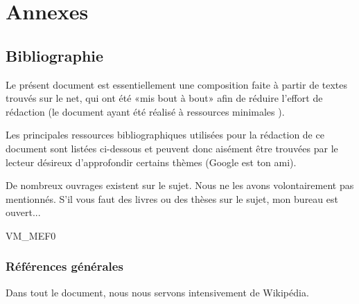 \documentclass[11pt,pdflatex]{book}
\begin{document}
 \appendix
 \part{Annexes}
 
 
 
 



 \ifVersionDuDocEstVincent
    \chapter*{Bibliographie}

Le présent document est essentiellement une composition faite à partir de textes  trouvés sur le net, qui ont été «mis bout à bout» afin de réduire l'effort  de rédaction (le document ayant été réalisé à ressources minimales ).


 Les principales  ressources bibliographiques utilisées pour la rédaction de ce document  sont listées ci-dessous et peuvent donc aisément être trouvées par le lecteur  désireux d'approfondir certains thèmes (Google est ton ami).


 De nombreux ouvrages existent sur le sujet. Nous ne les avons volontairement pas  mentionnés. S'il vous faut des livres ou des thèses sur le sujet, mon bureau est  ouvert...

 

 \begin{btSect}{VM_MEF0}
 \section*{Références générales}
 Dans tout le document, nous nous servons intensivement de Wikipédia.
 \btPrintAll
 \end{btSect} 
\end{document}
